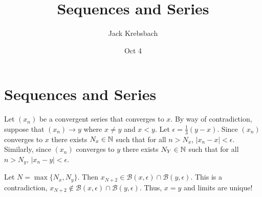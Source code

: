 \documentclass{report}
\title{Sequences and Series}
\author{Jack Krebsbach }
\date{Oct 4}
\begin{document}
\maketitle

\section{Sequences and Series}




\begin{myproof}
  Let $(x_n)$ be a convergent series that converges to $x.$ By way of contradiction, suppose that $(x_n) \rightarrow y$ where $x \neq y$ and $x < y$. Let $\epsilon = \frac{1}{3}(y-x).$  Since $(x_n)$ converges to $x$ there exists $N_x \in \NN$ such that for all $n> N_x$, $|x_n - x| < \epsilon.$ Similarly, since $(x_n)$ converges to $y$ there exists $N_Y \in \NN$ such that for all $n> N_y$, $|x_n - y| <\epsilon.$ 

  \par Let $N = \max\{N_x, N_y\}.$  Then $x_{N+2} \in \mathcal{B}(x,\epsilon) \cap \mathcal{B}(y,\epsilon)$. This is a contradiction, $x_{N+2} \not\in \mathcal{B}(x,\epsilon) \cap \mathcal{B}(y,\epsilon).$ Thus,  $x=y$ and limits are unique!
\end{myproof}


\end{document}
